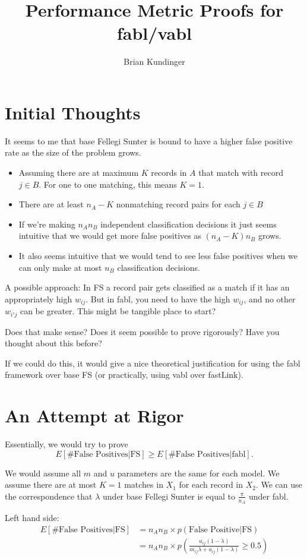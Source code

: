 \documentclass[12pt,letterpaper]{article}
\title{Performance Metric Proofs for fabl/vabl}
\author{Brian Kundinger}
\newcommand{\1}[1]{\mathbb{I}\!\left[#1\right]} %
\def\spacingset#1{\renewcommand{\baselinestretch}%
  {#1}\small\normalsize} \spacingset{1}
\begin{document}
\maketitle



\newpage
\spacingset{1.5}

\section{Initial Thoughts}

It seems to me that base Fellegi Sunter is bound to have a higher false positive rate as the size of the problem grows.

\begin{itemize}
	\item Assuming there are at maximum $K$ records in $A$ that match with record $j \in B$. For one to one matching, this means $K = 1$.
	\item There are at least $n_A - K$ nonmatching record pairs for each $j \in B$
	\item If we're making $n_A n_B$ independent classification decisions it just seems intuitive that we would get more false positives as $(n_A - K) n_B$ grows. 
	\item It also seems intuitive that we would tend to see less false positives when we can only make at most $n_B$ classification decisions. 
\end{itemize}
A possible approach: In FS a record pair gets classified as a match if it has an appropriately high $w_{ij}$. But in fabl, you need to have the high $w_{ij}$, and no other  $w_{i'j}$ can be greater. This might be tangible place to start?

Does that make sense? Does it seem possible to prove rigorously? Have you thought about this before?

If we could do this, it would give a nice theoretical justification for using the fabl framework over base FS (or practically, using vabl over fastLink). 

\section{An Attempt at Rigor}

Essentially, we would try to prove 
$$E[\text{\# False Positives} | \text{FS}] \geq E[\text{\# False Positives} | \text{fabl}].$$

We would assume all $m$ and $u$ parameters are the same for each model. We assume there are at most $K = 1$ matches in $X_1$ for each record in $X_2$. We can use the correspondence that $\lambda$ under base Fellegi Sunter is equal to $\frac{\pi}{n_A}$ under fabl. 

Left hand side:
\begin{align*}
	E[\text{\# False Positives} | \text{FS}] &= n_A n_B \times p(\text{False Positive}|\text{FS}) \\
	&=n_A n_B \times p\left(\frac{u_{ij}(1 - \lambda)}{m_{ij} \lambda  + u_{ij}(1 - \lambda)} \geq 0.5 \right) \\
\end{align*}



\end{document}
